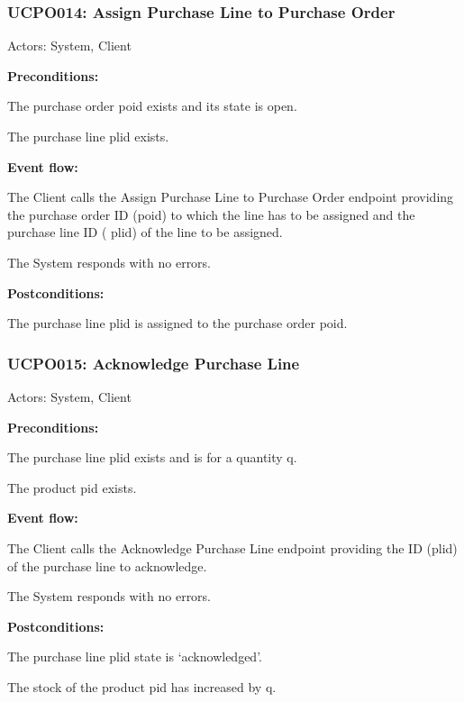 \begin{ucbox}{\subsubsection{UCPO014: Assign Purchase Line to Purchase Order}}
\label{UCPO014}

Actors: System, Client

\textbf{Preconditions:}

\ucitem The purchase order poid exists and its state is open.

\ucitem The purchase line plid exists.

\textbf{Event flow:}

\ucitem The Client calls the Assign Purchase Line to Purchase Order endpoint providing the purchase order ID (poid) to which the line has to be assigned and the purchase line ID (
plid) of the line to be assigned.

\ucitem The System responds with no errors.

\textbf{Postconditions:}

\ucitem The purchase line plid is assigned to the purchase order poid.

\end{ucbox}

\begin{ucbox}{\subsubsection{UCPO015: Acknowledge Purchase Line}}
\label{UCPO015}

Actors: System, Client

\textbf{Preconditions:}

\ucitem The purchase line plid exists and is for a quantity q.

\ucitem The product pid exists. 

\textbf{Event flow:}

\ucitem The Client calls the Acknowledge Purchase Line endpoint providing the ID (plid) of the purchase line to acknowledge.

\ucitem The System responds with no errors.

\textbf{Postconditions:}

\ucitem The purchase line plid state is ‘acknowledged’.

\ucitem The stock of the product pid has increased by q.

\end{ucbox}

